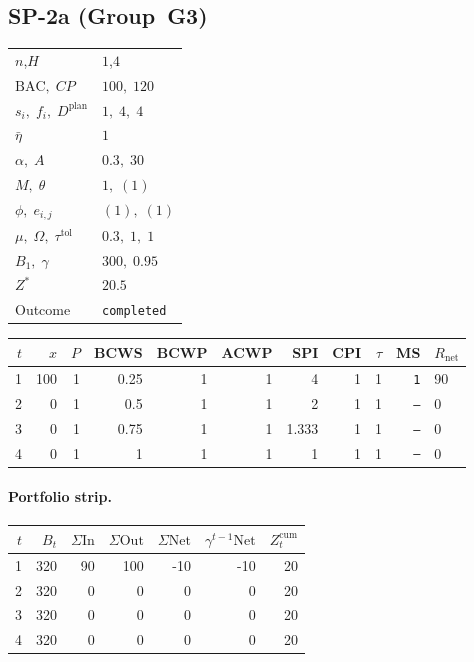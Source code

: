 \documentclass[12pt, a4paper]{article}
\newcommand{\BAC}{\mathrm{BAC}}
\begin{document}
\newpage

\subsection*{SP-2a  (Group~G3)}
\begin{center}
\begin{tabular}{ll}
\toprule
$n$,\;$H$ & $1$,\;$4$ \\
$\BAC,\;CP$ & $100,\;120$ \\
$s_i,\;f_i,\;D^{\mathrm{plan}}$ & $1,\;4,\;4$ \\
$\bar\eta$ & $1$ \\
$\alpha,\;A$ & $0.3,\;30$ \\
$M,\;\theta$ & $1,\;(1)$ \\
$\phi,\;e_{i,j}$ & $(1),\;(1)$ \\
$\mu,\;\Omega,\;\tau^{\mathrm{tol}}$ & $0.3,\;1,\;1$ \\
$B_1,\;\gamma$ & $300,\;0.95$ \\
$Z^*$ & $20.5$ \\
Outcome & \texttt{completed} \\
\bottomrule
\end{tabular}
\end{center}

\begin{center}
\begin{tabular}{rrrrrrrrrrl}
\toprule
$t$ & $x$ & $P$ & BCWS & BCWP & ACWP & SPI & CPI & $\tau$ & MS & $R_{\mathrm{net}}$\\
\midrule
1 & 100 & 1 & 0.25 & 1 & 1 & 4 & 1 & 1 & \texttt{1} & 90 \\
2 & 0 & 1 & 0.5 & 1 & 1 & 2 & 1 & 1 & \texttt{---} & 0 \\
3 & 0 & 1 & 0.75 & 1 & 1 & 1.333 & 1 & 1 & \texttt{---} & 0 \\
4 & 0 & 1 & 1 & 1 & 1 & 1 & 1 & 1 & \texttt{---} & 0 \\
\bottomrule
\end{tabular}
\end{center}
\paragraph{Portfolio strip.}
\begin{center}
\begin{tabular}{rrrrrrr}
\toprule
$t$ & $B_t$ & $\Sigma\mathrm{In}$ & $\Sigma\mathrm{Out}$ & $\Sigma\mathrm{Net}$ & $\gamma^{t-1}\mathrm{Net}$ & $Z_t^{\mathrm{cum}}$\\
\midrule
1 & 320 & 90 & 100 & -10 & -10 & 20 \\
2 & 320 & 0 & 0 & 0 & 0 & 20 \\
3 & 320 & 0 & 0 & 0 & 0 & 20 \\
4 & 320 & 0 & 0 & 0 & 0 & 20 \\
\bottomrule
\end{tabular}
\end{center}
\end{document}
